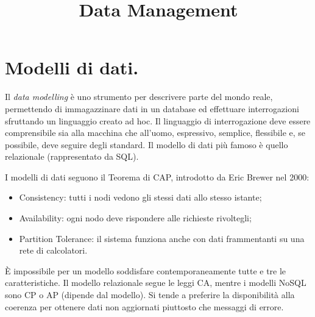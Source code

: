 \documentclass[a4page, 11pt]{article}
\title{Data Management}
\author{}
\date{}
\begin{document}
\maketitle

\tableofcontents
\newpage

\section{Modelli di dati.}
Il \textit{data modelling} è uno strumento per descrivere parte del mondo reale, permettendo di immagazzinare dati in un database ed effettuare interrogazioni sfruttando un linguaggio creato ad hoc.
Il linguaggio di interrogazione deve essere comprensibile sia alla macchina che all'uomo, espressivo, semplice, flessibile e, se possibile, deve seguire degli standard.
Il modello di dati più famoso è quello relazionale (rappresentato da SQL).

I modelli di dati seguono il Teorema di CAP, introdotto da Eric Brewer nel 2000:
\begin{itemize}
\item Consistency: tutti i nodi vedono gli stessi dati allo stesso istante;
\item Availability: ogni nodo deve rispondere alle richieste rivoltegli;
\item Partition Tolerance: il sistema funziona anche con dati frammentanti su una rete di calcolatori.
\end{itemize}
È impossibile per un modello soddisfare contemporaneamente tutte e tre le caratteristiche\cite{NoSQLDB}.
Il modello relazionale segue le leggi CA, mentre i modelli NoSQL sono CP o AP (dipende dal modello).
Si tende a preferire la disponibilità alla coerenza per ottenere dati non aggiornati piuttosto che messaggi di errore.
\end{document}
